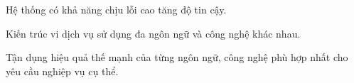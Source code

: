 Hệ thống có khả năng chịu lỗi cao tăng độ tin cậy.








Kiến trúc vi dịch vụ sử dụng đa ngôn ngữ và công nghệ khác nhau.

Tận dụng hiệu quả thế mạnh của từng ngôn ngữ, công nghệ phù hợp nhất cho yêu cầu nghiệp vụ cụ thể.








